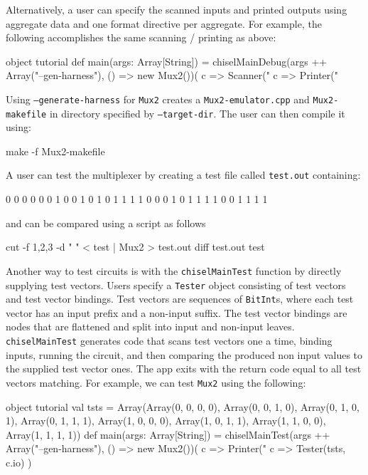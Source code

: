 \documentclass[10pt,twocolumn]{article}
\def\code#1{{\small\tt #1}}
\begin{document}
Alternatively, a user can specify the scanned inputs and printed
outputs using aggregate data and one format directive per aggregate.  
For example, the following accomplishes the same scanning / printing
as above:

\begin{scala}
object tutorial {
  def main(args: Array[String]) = {
    chiselMainDebug(args ++ Array("--gen-harness"), 
                    () => new Mux2())(
      c => Scanner("%
      c => Printer("%
  }
}
\end{scala}
 
Using \code{--generate-harness} for \code{Mux2}
creates a \code{Mux2-emulator.cpp}  and \code{Mux2-makefile} in directory
specified by \code{--target-dir}.  The user can then compile it using:

\begin{scala}
make -f Mux2-makefile
\end{scala}

\noindent

A user can test the multiplexer by creating a test file called
\code{test.out} containing:
\begin{scala}
0 0 0 0
0 0 1 0
0 1 0 1
0 1 1 1
1 0 0 0
1 0 1 1
1 1 0 0
1 1 1 1
\end{scala}

\noindent
and can be compared using a script as follows

\begin{scala}
cut -f 1,2,3 -d " " < test | Mux2 > test.out
diff test.out test
\end{scala}
 
Another way to test circuits is with the \code{chiselMainTest}
function by directly supplying test vectors.
Users specify a \code{Tester} object consisting of test vectors and
test vector bindings.
Test vectors are sequences of \code{BitInt}s, 
where  each test vector has an input prefix and a non-input suffix.
The test vector bindings are nodes that are flattened and split into
input and non-input leaves.
\code{chiselMainTest} generates code that scans test vectors one a
time, binding inputs,  running the circuit, and then comparing the
produced non input values to the supplied test vector ones.
The app exits with the return code equal to all test vectors matching.
For example, we can test \code{Mux2} using the following:

\begin{scala}
object tutorial {
  val tsts = 
     Array(Array(0, 0, 0, 0),
           Array(0, 0, 1, 0),
           Array(0, 1, 0, 1),
           Array(0, 1, 1, 1),
           Array(1, 0, 0, 0),
           Array(1, 0, 1, 1),
           Array(1, 1, 0, 0),
           Array(1, 1, 1, 1))
  def main(args: Array[String]) = {
    chiselMainTest(args ++ Array("--gen-harness"), 
                   () => new Mux2())(
      c => Printer("%
      c => Tester(tsts, c.io)
   )
  }
}
\end{scala}
\end{document}
